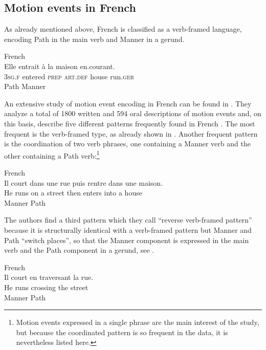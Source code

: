 \documentclass[output=paper,colorlinks,citecolor=brown]{langscibook}
\begin{document}
\subsection{Motion events in French}

As already mentioned above, French is classified as a verb-framed language, encoding Path in the main verb and Manner in a gerund.

\ea\label{ex:3:7}French\\
\glll  Elle entrait à la  maison en.courant.\\
       \textsc{3sg.f} entered \textsc{prep} \textsc{art.def} house run.\textsc{ger} \\
       {} Path {} {} {} Manner\\
\z


An extensive study of motion event encoding in French can be found in \citet{Pourcel_Kopecka_2005}. They analyze a total of 1800 written and 594 oral descriptions of motion events and, on this basis, describe five different patterns frequently found in French \citep[145--149]{Pourcel_Kopecka_2005}. The most frequent is the verb-framed type, as already shown in . Another frequent pattern is the coordination of two verb phrases, one containing a Manner verb and the other containing a Path verb:\footnote{Motion events expressed in a single phrase are the main interest of the study, but because the coordinated pattern is so frequent in the data, it is nevertheless listed here.}

\ea\label{ex:3:8}French \citep[145]{Pourcel_Kopecka_2005}\\
\glll  Il court dans une rue puis rentre dans une maison.\\
       He runs on a street then enters into a house \\
       {} Manner {} {}  Path  \\
\z

The authors find a third pattern which they call “reverse verb-framed pattern” because it is structurally identical with a verb-framed pattern but Manner and Path “switch places”, so that the Manner component is expressed in the main verb and the Path component in a gerund, see .

\ea\label{ex:3:9}French \citep[145]{Pourcel_Kopecka_2005}\\
\glll Il court {en traversant} la rue.\\
      He runs crossing the street\\
      {} Manner {}  Path\\  
\z
\end{document}

